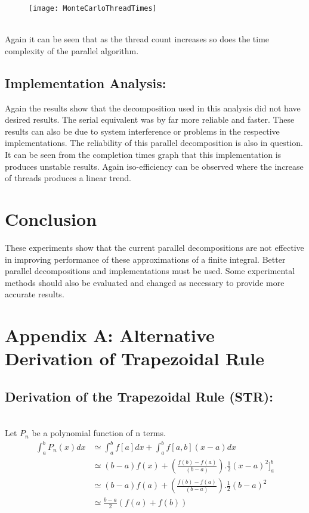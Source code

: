\documentclass[11pt]{article}
\begin{document}
\begin{page}
\begin{figure}[ht]
\centering
     \texttt{[image: MonteCarloThreadTimes]}
\end{figure}\\

\noindent Again it can be seen that as the thread count increases so does the time complexity of the parallel algorithm.

\break
\subsection{Implementation Analysis:}
Again the results show that the decomposition used in this analysis did not have desired results. The serial equivalent was by far more reliable and faster. These results can also be due to system interference or problems in the respective implementations. The reliability of this parallel decomposition is also in question. It can be seen from the completion times graph that this implementation is produces unstable results. Again iso-efficiency can be observed where the increase of threads produces a linear trend.

\section{Conclusion}
These experiments show that the current parallel decompositions are not effective in improving performance of these approximations of a finite integral. Better parallel decompositions and implementations must be used. Some experimental methods should also be evaluated and changed as necessary to provide more accurate results.

\break
\section{Appendix A: Alternative Derivation of Trapezoidal Rule}
\subsection{Derivation of the Trapezoidal Rule (STR):}\\
\noindent Let $P_n$ be a polynomial function of n terms.\\

\begin{equation}
\begin{aligned}
    \int_{a}^{b} P_n(x) dx &\simeq{} \int_{a}^{b} f[a]dx + \int_{a}^{b} f[a,b](x-a)dx\\
    &\simeq{} (b-a)f(x) + (\frac{f(b)-f(a)}{(b-a)}).\frac{1}{2}(x-a)^{2}]_{a}^{b}\\
    &\simeq{} (b-a)f(a) + (\frac{f(b)-f(a)}{(b-a)}).\frac{1}{2}(b-a)^{2}\\
    &\simeq{} \frac{b-a}{2}(f(a)+f(b))
\end{aligned}
\end{equation}


\end{page}
\end{document}
